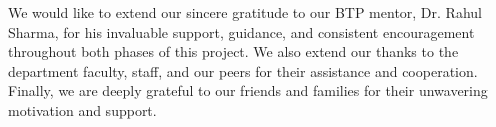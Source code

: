 
We would like to extend our sincere gratitude to our BTP mentor, Dr. Rahul Sharma, for his invaluable support, guidance, and consistent encouragement throughout both phases of this project. We also extend our thanks to the department faculty, staff, and our peers for their assistance and cooperation. Finally, we are deeply grateful to our friends and families for their unwavering motivation and support.
